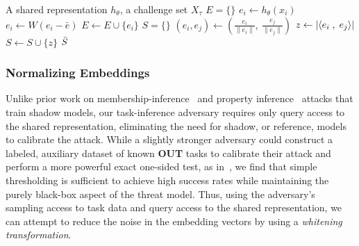 \begin{algorithm}[H]
    \caption{Pairwise Inner Product Attack}
    \label{alg:inner_attack}
    \begin{algorithmic}[1]
        A shared representation $h_\theta$, a challenge set  $X_\tau$
       \State $E = \{ \}$ 
           \State $e_i \gets h_\theta(x_i)$ 
           \State $e_i 
           \gets W (e_i - \bar{e}) $ 
           \State $E \gets E \cup \{ e_i \}$ 
       \EndFor
       \State $S = \{ \}$
               \State $(e_i, e_j) \gets \left( \frac{e_i}{\| e_i \|}, 
               \: \frac{e_j}{\| e_j \|} \right)$
           \EndIf
           \State $z \gets \vert \langle e_i \; , \; e_j \rangle \vert$
           \State $S \gets S \cup \{ z \}$
       \EndFor
       \State \Return $\Bar{S}$ 
    \end{algorithmic}
\end{algorithm}

\subsubsection{Normalizing Embeddings} Unlike prior work on membership-inference~\cite{shokri-2016-mi,carlini-2022-lira} and property inference~\cite{chaudhari-2022-snap, mahloujifar2022propertypoisoning} attacks that train shadow models, our task-inference adversary requires only query access to the shared representation, eliminating the need for shadow, or reference, models to calibrate the attack. While a slightly stronger adversary could construct a labeled, auxiliary dataset of known \textbf{OUT} tasks to calibrate their attack and perform a more powerful exact one-sided test, as in~\cite{carlini-2022-lira}, we find that simple thresholding is sufficient to achieve high success rates while maintaining the purely black-box aspect of the threat model. Thus, using the adversary's sampling access to task data and query access to the shared representation, we can attempt to reduce the noise in the embedding vectors by using a \textit{whitening transformation}.

